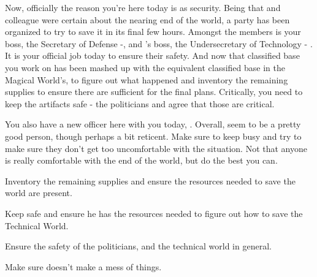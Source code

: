 \documentclass[char]{guildcamp3}
\begin{document}
Now, officially the reason you're here today is as security. Being that \cSciOne{\informal} and \cSciOne{\their} colleague were certain about the nearing end of the world, a party has been organized to try to save it in its final few hours. Amongst the members is your boss, the Secretary of Defense -\cPoliOne{\intro}, and \cSciOne{\informal}'s boss, the Undersecretary of Technology - \cPoliTwo{\intro}. It is your official job today to ensure their safety. And now that classified base you work on has been mashed up with the equivalent classified base in the Magical World's, to figure out what happened and inventory the remaining supplies to ensure there are sufficient for the final plans. Critically, you need to keep the artifacts safe - the politicians and \cSciOne{\informal} agree that those are critical. 

You also have a new officer here with you today, \cSpecOpTwo{\intro}. Overall, \cSpecOpTwo{\they} seem to be a pretty good person, though perhaps a bit reticent. Make sure to keep \cSpecOpTwo{\them} busy and try to make sure they don't get too uncomfortable with the situation. Not that anyone is really comfortable with the end of the world, but do the best you can. 




\begin{itemz}[Goals]
  \item Inventory the remaining supplies and ensure the resources needed to save the world are present.
  \item Keep \cSciOne{\informal{}} safe and ensure he has the resources needed to figure out how to save the Technical World. 
  \item Ensure the safety of the politicians, and the technical world in general.
  \item Make sure \cRogueTwo{\full{}} doesn't make a mess of things. 
\end{itemz}
\end{document}
